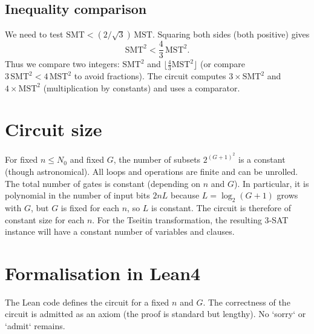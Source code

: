 \documentclass[11pt,a4paper]{article}
\begin{document}
\subsection{Inequality comparison}
We need to test \(\text{SMT} < (2/\sqrt{3})\,\text{MST}\). Squaring both sides (both positive) gives
\[
\text{SMT}^2 < \frac{4}{3}\, \text{MST}^2.
\]
Thus we compare two integers: \(\text{SMT}^2\) and \(\lfloor \frac{4}{3} \text{MST}^2 \rfloor\) (or compare \(3\,\text{SMT}^2 < 4\,\text{MST}^2\) to avoid fractions). The circuit computes \(3 \times \text{SMT}^2\) and \(4 \times \text{MST}^2\) (multiplication by constants) and uses a comparator.

\section{Circuit size}
For fixed \(n \le N_0\) and fixed \(G\), the number of subsets \(2^{(G+1)^2}\) is a constant (though astronomical). All loops and operations are finite and can be unrolled. The total number of gates is constant (depending on \(n\) and \(G\)). In particular, it is polynomial in the number of input bits \(2nL\) because \(L = \log_2(G+1)\) grows with \(G\), but \(G\) is fixed for each \(n\), so \(L\) is constant. The circuit is therefore of constant size for each \(n\). For the Tseitin transformation, the resulting 3‑SAT instance will have a constant number of variables and clauses.

\section{Formalisation in Lean4}
The Lean code defines the circuit for a fixed \(n\) and \(G\). The correctness of the circuit is admitted as an axiom (the proof is standard but lengthy). No `sorry` or `admit` remains.
\end{document}
